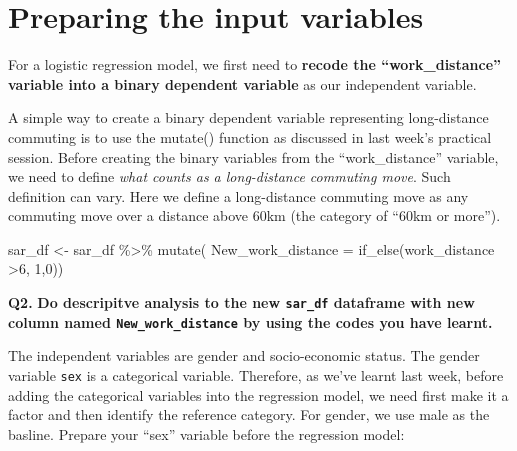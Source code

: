 \documentclass[
  letterpaper,
  DIV=11,
  numbers=noendperiod]{scrreprt}
\newenvironment{Shaded}{\begin{snugshade}}{\end{snugshade}}
\newcommand{\AttributeTok}[1]{\textcolor[rgb]{0.40,0.45,0.13}{#1}}
\newcommand{\DecValTok}[1]{\textcolor[rgb]{0.68,0.00,0.00}{#1}}
\newcommand{\FunctionTok}[1]{\textcolor[rgb]{0.28,0.35,0.67}{#1}}
\newcommand{\NormalTok}[1]{\textcolor[rgb]{0.00,0.23,0.31}{#1}}
\newcommand{\OtherTok}[1]{\textcolor[rgb]{0.00,0.23,0.31}{#1}}
\newcommand{\SpecialCharTok}[1]{\textcolor[rgb]{0.37,0.37,0.37}{#1}}
\newcommand{\StringTok}[1]{\textcolor[rgb]{0.13,0.47,0.30}{#1}}
\begin{document}
\section{Preparing the input
variables}\label{preparing-the-input-variables}

For a logistic regression model, we first need to \textbf{recode the
``work\_distance'' variable into a binary dependent variable} as our
independent variable.

A simple way to create a binary dependent variable representing
long-distance commuting is to use the mutate() function as discussed in
last week's practical session. Before creating the binary variables from
the ``work\_distance'' variable, we need to define \emph{what counts as
a long-distance commuting move}. Such definition can vary. Here we
define a long-distance commuting move as any commuting move over a
distance above 60km (the category of ``60km or more'').

\begin{Shaded}
\begin{Highlighting}[]
\NormalTok{sar\_df }\OtherTok{\textless{}{-}}\NormalTok{ sar\_df }\SpecialCharTok{\%\textgreater{}\%} \FunctionTok{mutate}\NormalTok{(}
  \AttributeTok{New\_work\_distance =} \FunctionTok{if\_else}\NormalTok{(work\_distance }\SpecialCharTok{\textgreater{}}\DecValTok{6}\NormalTok{, }\DecValTok{1}\NormalTok{,}\DecValTok{0}\NormalTok{))}
\end{Highlighting}
\end{Shaded}

\textbf{Q2.} \textbf{Do descripitve analysis to the new \texttt{sar\_df}
dataframe with new column named \texttt{New\_work\_distance} by using
the codes you have learnt.}

The independent variables are gender and socio-economic status. The
gender variable \texttt{sex} is a categorical variable. Therefore, as
we've learnt last week, before adding the categorical variables into the
regression model, we need first make it a factor and then identify the
reference category. For gender, we use male as the basline. Prepare your
``sex'' variable before the regression model:

\begin{Shaded}
\end{Shaded}
\end{document}
